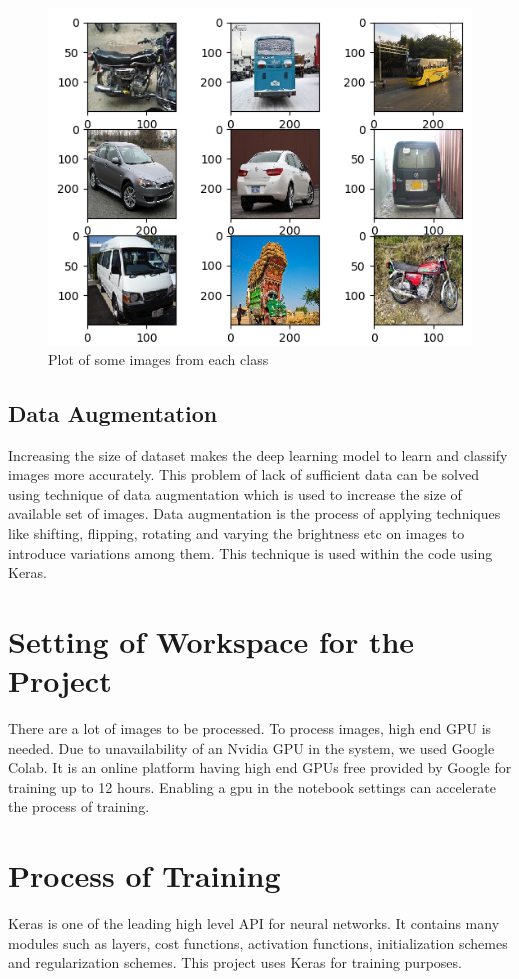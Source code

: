 \begin{figure}[H]
    \centering
    \captionsetup{justification = centering}
    \includegraphics[scale = 0.8]{CHAPTERS/Chapter-4/Images/4.1.png}
    \caption{Plot of some images from each class} 
    \label{fig:4.1}
  \end{figure}

\subsection{Data Augmentation}
Increasing the size of dataset makes the deep learning model to learn and classify images more accurately. This problem of lack of sufficient data can be solved using technique of data augmentation which is used to increase the size of available set of images.
Data augmentation is the process of applying techniques like shifting, flipping, rotating and varying the brightness etc on images to introduce variations among them.
This technique is used within the code using Keras.
\section{Setting of Workspace for the Project}
There are a lot of images to be processed. To process images, high end GPU is
needed. Due to unavailability of an Nvidia GPU in the system, we used Google Colab.
It is an online platform having high end GPUs free provided by Google for training
up to 12 hours. Enabling a gpu in the notebook settings can accelerate the process of
training.
\section{Process of Training}
Keras is one of the leading high level API for neural networks. It contains
many modules such as layers, cost functions, activation functions, initialization
schemes and regularization schemes. This project uses Keras for training purposes.
